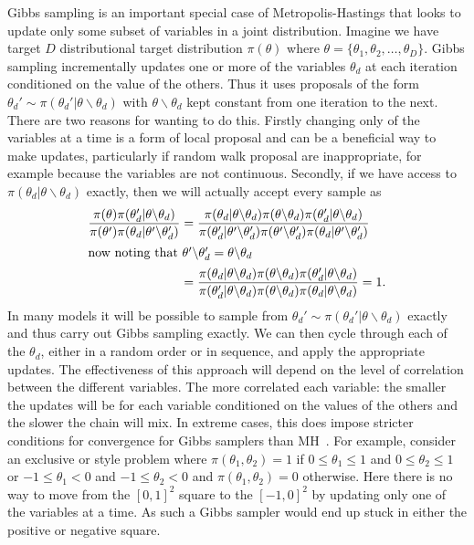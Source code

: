 Gibbs sampling is an important special case of Metropolis-Hastings that looks to update only some
subset of variables in a joint distribution.  Imagine we have target $D$ distributional target distribution
$\pi(\theta)$ where $\theta = \{\theta_1,\theta_2,\dots,\theta_D\}$.  Gibbs sampling incrementally
updates one or more of the variables $\theta_d$ at each iteration conditioned on the value of the others.
Thus it uses proposals of the form $\theta_d' \sim \pi(\theta_d' | \theta \backslash \theta_d)$ with
$ \theta \backslash \theta_d$ kept constant from one iteration to the next.  There are two reasons
for wanting to do this.  Firstly changing only of the variables at a time is a form of local proposal and
can be a beneficial way to make updates, particularly if random walk proposal are inappropriate, for example
because the variables are not continuous.  Secondly, if we have access to $\pi(\theta_d | \theta \backslash \theta_d)$
exactly, then we will actually accept every sample as
\begin{align*}
\frac{\pi(\theta)\pi(\theta_d' | \theta \backslash \theta_d)}{\pi(\theta')\pi(\theta_d | \theta' \backslash \theta_d')}
&=\frac{\pi(\theta_d |  \theta \backslash \theta_d) \pi( \theta \backslash \theta_d)
	\pi(\theta_d' | \theta \backslash \theta_d)}
{\pi(\theta_d' |  \theta' \backslash \theta_d') \pi( \theta' \backslash \theta_d')\pi(\theta_d | \theta' \backslash \theta_d')} \\
\intertext{now noting that $\theta' \backslash \theta_d' = \theta \backslash \theta_d$}
&=\frac{\pi(\theta_d |  \theta \backslash \theta_d) \pi( \theta \backslash \theta_d)
	\pi(\theta_d' | \theta \backslash \theta_d)}
{\pi(\theta_d' |  \theta \backslash \theta_d) \pi( \theta \backslash \theta_d)\pi(\theta_d | \theta \backslash \theta_d)} 
= 1.
\end{align*}
In many models it will be possible to sample from $\theta_d' \sim \pi(\theta_d' | \theta \backslash \theta_d)$
exactly and thus carry out Gibbs sampling exactly.  We can then cycle through each of
the $\theta_d$, either in a random order or in sequence, and apply the appropriate updates.  The
effectiveness of this approach will depend on the level of correlation between the different variables.  The more
correlated each variable: the smaller the updates will be for each variable conditioned on the values of the
others and the slower the chain will mix.  In extreme cases, this does impose stricter conditions
for convergence for Gibbs samplers than MH~\citep{roberts1994simple}.  For example, consider an exclusive
or style problem where $\pi(\theta_1,\theta_2) = 1$ if $0\le\theta_1\le1$ and $0\le\theta_2\le1$
or $-1\le\theta_1<0$ and $-1\le\theta_2<0$ and $\pi(\theta_1,\theta_2) = 0$ otherwise.  Here there is no
way to move from the $[0,1]^2$ square to the $[-1,0]^2$ by updating only one of the variables at a time.  As
such a Gibbs sampler would end up stuck in either the positive or negative square.

